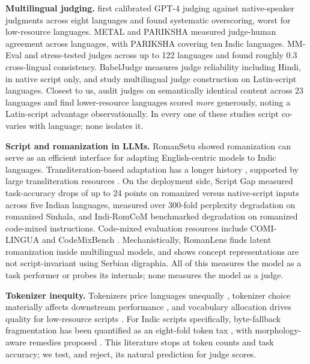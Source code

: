 \documentclass[10pt,twocolumn]{article}
\begin{document}
\textbf{Multilingual judging.} \citet{hada2024evaluators} first calibrated GPT-4 judging against native-speaker judgments across eight languages and found systematic overscoring, worst for low-resource languages. METAL \citep{hada2024metal} and PARIKSHA \citep{watts2024pariksha} measured judge-human agreement across languages, with PARIKSHA covering ten Indic languages. MM-Eval \citep{son2024mmeval} and \citet{fu2025reliable} stress-tested judges across up to 122 languages and found roughly 0.3 cross-lingual consistency. BabelJudge \citep{kc2026babeljudge} measures judge reliability including Hindi, in native script only, and \citet{zubiaga2026multilingualjudge} study multilingual judge construction on Latin-script languages. Closest to us, \citet{zhou2026lower} audit judges on semantically identical content across 23 languages and find lower-resource languages scored \emph{more} generously, noting a Latin-script advantage observationally. In every one of these studies script co-varies with language; none isolates it.

\textbf{Script and romanization in LLMs.} RomanSetu \citep{husain2024romansetu} showed romanization can serve as an efficient interface for adapting English-centric models to Indic languages. Transliteration-based adaptation has a longer history \citep{purkayastha2023romanization, xhelili2024breaking}, supported by large transliteration resources \citep{madhani2023aksharantar}. On the deployment side, Script Gap \citep{khullar2025scriptgap} measured task-accuracy drops of up to 24 points on romanized versus native-script inputs across five Indian languages, \citet{rajapakse2026sinhala} measured over 300-fold perplexity degradation on romanized Sinhala, and Indi-RomCoM \citep{das2026indiromcom} benchmarked degradation on romanized code-mixed instructions. Code-mixed evaluation resources include COMI-LINGUA \citep{sheth2025comilingua} and CodeMixBench \citep{yang2025codemixbench}. Mechanistically, RomanLens \citep{saji2025romanlens} finds latent romanization inside multilingual models, and \citet{karne2026onelanguage} shows concept representations are not script-invariant using Serbian digraphia. All of this measures the model as a task performer or probes its internals; none measures the model as a judge.

\textbf{Tokenizer inequity.} Tokenizers price languages unequally \citep{petrov2023tokenizers, ahia2023costs}, tokenizer choice materially affects downstream performance \citep{ali2024tokenizer}, and vocabulary allocation drives quality for low-resource scripts \citep{liang2023xlmv}. For Indic scripts specifically, byte-fallback fragmentation has been quantified as an eight-fold token tax \citep{srivastava2026tokenizertax}, with morphology-aware remedies proposed \citep{limisiewicz2024myte, brahma2025morphtok}. This literature stops at token counts and task accuracy; we test, and reject, its natural prediction for judge scores.
\end{document}
